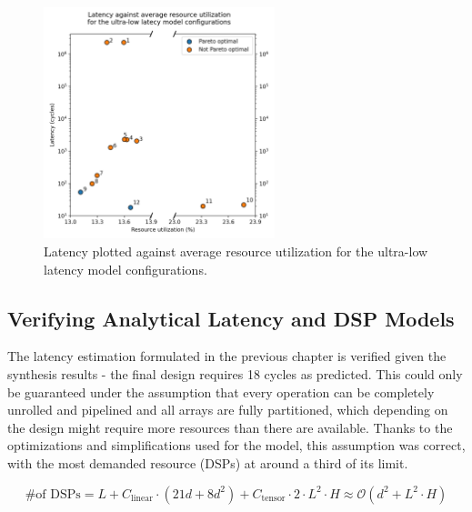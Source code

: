 \begin{figure}[hpt!]
  \centering
  \includegraphics[trim={0cm 0cm 0cm 1.3cm}, clip, width=0.6\textwidth, center]{../logs/hardware_optimizations_pareto.png}
  \caption{Latency plotted against average resource utilization for the ultra-low latency model configurations.}
  \label{fig:hardware-optimizations-pareto}
\end{figure}

\subsection{Verifying Analytical Latency and DSP Models}

The latency estimation formulated in the previous chapter is verified given the synthesis results - the final design requires 18 cycles as predicted. This could only be guaranteed under the assumption that every operation can be completely unrolled and pipelined and all arrays are fully partitioned, which depending on the design might require more resources than there are available. Thanks to the optimizations and simplifications used for the model, this assumption was correct, with the most demanded resource (DSPs) at around a third of its limit.

\begin{equation} \label{eq:dsp-model-new}
  \text{\# of DSPs} = L + C_{\text{linear}} \cdot (21d + 8d^2) + C_{\text{tensor}} \cdot 2 \cdot L^2 \cdot H \approx \mathcal{O}(d^2 + L^2 \cdot H)
\end{equation}

